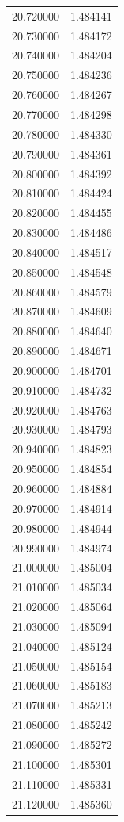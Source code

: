 \begin{tabular}{rr}
20.720000 & 1.484141 \\
20.730000 & 1.484172 \\
20.740000 & 1.484204 \\
20.750000 & 1.484236 \\
20.760000 & 1.484267 \\
20.770000 & 1.484298 \\
20.780000 & 1.484330 \\
20.790000 & 1.484361 \\
20.800000 & 1.484392 \\
20.810000 & 1.484424 \\
20.820000 & 1.484455 \\
20.830000 & 1.484486 \\
20.840000 & 1.484517 \\
20.850000 & 1.484548 \\
20.860000 & 1.484579 \\
20.870000 & 1.484609 \\
20.880000 & 1.484640 \\
20.890000 & 1.484671 \\
20.900000 & 1.484701 \\
20.910000 & 1.484732 \\
20.920000 & 1.484763 \\
20.930000 & 1.484793 \\
20.940000 & 1.484823 \\
20.950000 & 1.484854 \\
20.960000 & 1.484884 \\
20.970000 & 1.484914 \\
20.980000 & 1.484944 \\
20.990000 & 1.484974 \\
21.000000 & 1.485004 \\
21.010000 & 1.485034 \\
21.020000 & 1.485064 \\
21.030000 & 1.485094 \\
21.040000 & 1.485124 \\
21.050000 & 1.485154 \\
21.060000 & 1.485183 \\
21.070000 & 1.485213 \\
21.080000 & 1.485242 \\
21.090000 & 1.485272 \\
21.100000 & 1.485301 \\
21.110000 & 1.485331 \\
21.120000 & 1.485360 \\

\end{tabular}
